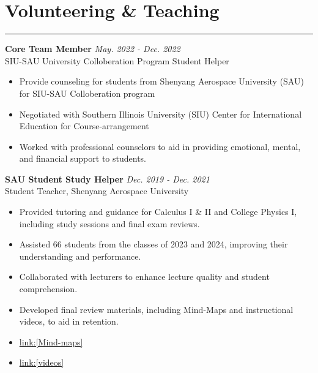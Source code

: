 \documentclass[11pt]{article}
\begin{document}


\section*{Volunteering \& Teaching}
\hrule

\noindent\textbf{Core Team Member} \hfill \textit{May. 2022 - Dec. 2022} \\
SIU-SAU University Colloberation Program Student Helper
\begin{itemize}[leftmargin=*,itemsep=1pt]
    \item Provide counseling for students from Shenyang Aerospace University (SAU) for SIU-SAU Colloberation program
    \item Negotiated with Southern Illinois University (SIU) Center for International Education for Course-arrangement
    \item Worked with professional counselors to aid in providing emotional, mental, and financial support to students.
\end{itemize}

\vspace{2mm}

\noindent \textbf{SAU Student Study Helper} \hfill \textit{Dec. 2019 - Dec. 2021} \\
Student Teacher, Shenyang Aerospace University 
\begin{itemize}[leftmargin=*,itemsep=1pt] 
    \item Provided tutoring and guidance for Calculus I \& II and College Physics I, including study sessions and final exam reviews. 
    \item Assisted 66 students from the classes of 2023 and 2024, improving their understanding and performance. 
    \item Collaborated with lecturers to enhance lecture quality and student comprehension. 
    \item Developed final review materials, including Mind-Maps and instructional videos, to aid in retention. 
    \item \href{https://zhbalex.github.io/knowledgetable.html}{link:[Mind-maps]}
    \item \href{ https://www.bilibili.com/video/BV1x5411b7tP/?share_source=copy_web&vd_source=e0cfc2571d8eeaec6f9f0598e6af3d9d}{link:[videos]}
\end{itemize}


\end{document}
